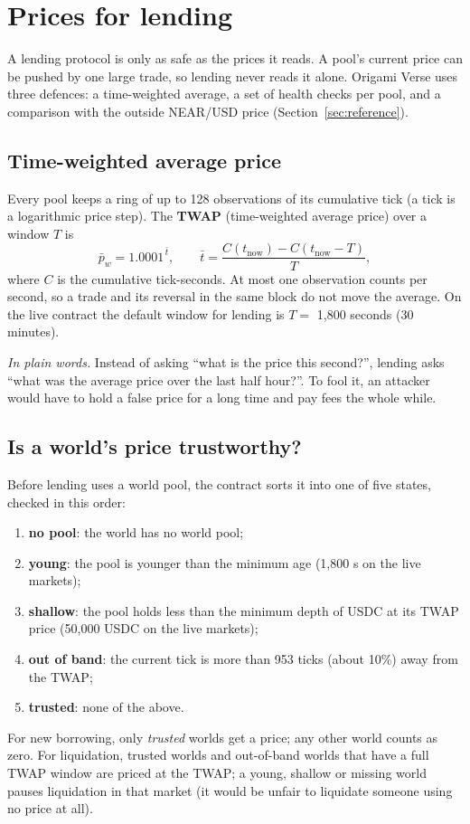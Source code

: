 \documentclass[11pt,a4paper]{article}
\newcommand{\inwords}[1]{\par\noindent\colorbox{note}{\parbox{\dimexpr\linewidth-2\fboxsep}{\small\textit{In plain words.} #1}}\par}
\begin{document}
\section{Prices for lending}
\label{sec:prices}

A lending protocol is only as safe as the prices it reads. A pool's current price can be pushed by one large trade,
so lending never reads it alone. Origami Verse uses three defences: a time-weighted average, a set of health checks per
pool, and a comparison with the outside NEAR/USD price (Section~\ref{sec:reference}).

\subsection{Time-weighted average price}

Every pool keeps a ring of up to 128 observations of its cumulative tick (a tick is a logarithmic price step).
The \textbf{TWAP} (time-weighted average price) over a window $T$ is
\begin{equation}
  \bar{p}_w = 1.0001^{\,\bar{t}}, \qquad \bar{t} = \frac{C(t_{\text{now}}) - C(t_{\text{now}} - T)}{T},
  \label{eq:twap}
\end{equation}
where $C$ is the cumulative tick-seconds. At most one observation counts per second, so a trade and its reversal in
the same block do not move the average. On the live contract the default window for lending is $T =$ 1,800 seconds
(30 minutes).
\inwords{Instead of asking ``what is the price this second?'', lending asks ``what was the average price over the
last half hour?''. To fool it, an attacker would have to hold a false price for a long time and pay fees the whole
while.}

\subsection{Is a world's price trustworthy?}

Before lending uses a world pool, the contract sorts it into one of five states, checked in this order:
\begin{enumerate}
  \item \textbf{no pool}: the world has no world pool;
  \item \textbf{young}: the pool is younger than the minimum age (1,800 s on the live markets);
  \item \textbf{shallow}: the pool holds less than the minimum depth of USDC at its TWAP price (50,000 USDC on the
  live markets);
  \item \textbf{out of band}: the current tick is more than 953 ticks (about 10\%) away from the TWAP;
  \item \textbf{trusted}: none of the above.
\end{enumerate}
For new borrowing, only \emph{trusted} worlds get a price; any other world counts as zero. For liquidation, trusted
worlds and out-of-band worlds that have a full TWAP window are priced at the TWAP; a young, shallow or missing world
pauses liquidation in that market (it would be unfair to liquidate someone using no price at all).
\end{document}
